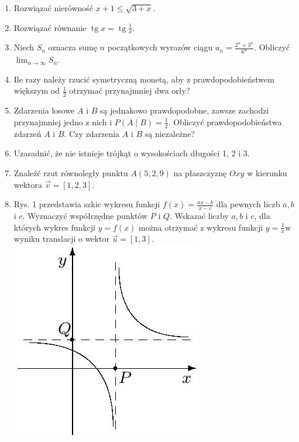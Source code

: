 \documentclass[10pt]{article}
\begin{document}
\begin{enumerate}
  \item Rozwiązać nierówność \(x+1 \leqslant \sqrt{3+x}\).
  \item Rozwiązać równanie \(\operatorname{tg} x=\operatorname{tg} \frac{1}{x}\).
  \item Niech \(S_{n}\) oznacza sumę \(n\) początkowych wyrazów ciągu \(a_{n}=\frac{2^{n}+3^{n}}{6^{n}}\). Obliczyć \(\lim _{n \rightarrow \infty} S_{n}\).
  \item Ile razy należy rzucić symetryczną monetą, aby z prawdopodobieństwem większym od \(\frac{1}{2}\) otrzymać przynajmniej dwa orły?
  \item Zdarzenia losowe \(A\) i \(B\) są jednakowo prawdopodobne, zawsze zachodzi przynajmniej jedno z nich i \(P(A \mid B)=\frac{1}{2}\). Obliczyć prawdopodobieństwa zdarzeń \(A\) i \(B\). Czy zdarzenia \(A\) i \(B\) są niezależne?
  \item Uzasadnić, że nie istnieje trójkąt o wysokościach długości 1, 2 i 3.
  \item Znaleźć rzut równoległy punktu \(A(5,2,9)\) na płaszczyznę \(O x y\) w kierunku wektora \(\vec{v}=[1,2,3]\).
  \item Rys. 1 przedstawia szkic wykresu funkcji \(f(x)=\frac{a x-b}{x-c}\) dla pewnych liczb \(a, b\) i \(c\). Wyznaczyć współrzędne punktów \(P\) i \(Q\). Wskazać liczby \(a, b\) i \(c\), dla których wykres funkcji \(y=f(x)\) można otrzymać z wykresu funkcji \(y=\frac{1}{x} \mathrm{w}\) wyniku translacji o wektor \(\vec{u}=[1,3]\).\\
\includegraphics[max width=\textwidth, center]{2024_11_21_17fc964787b720e2b056g-2}
\end{enumerate}
\end{document}
